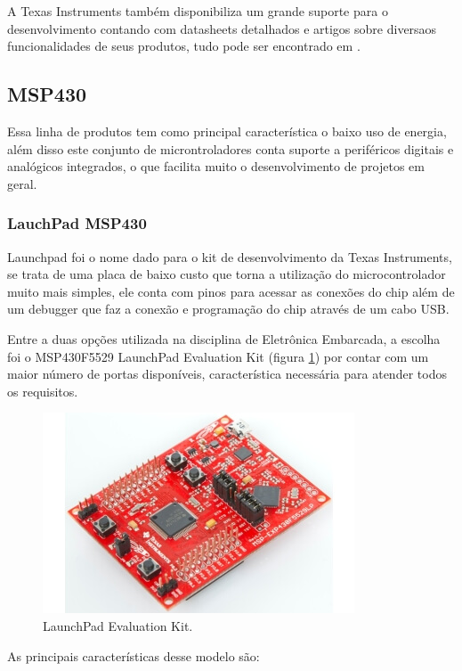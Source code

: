 A Texas Instruments também disponibiliza um grande suporte para o desenvolvimento contando com datasheets detalhados e artigos sobre diversaos funcionalidades de seus produtos, tudo pode ser encontrado em .

\subsection{MSP430}

Essa linha de produtos tem como principal característica o baixo uso de energia, além disso este conjunto de microntroladores conta suporte a periféricos digitais e analógicos integrados, o que facilita muito o desenvolvimento de projetos em geral.

\subsubsection{LauchPad MSP430}

Launchpad foi o nome dado para o kit de desenvolvimento da Texas Instruments, se trata de uma placa de baixo custo que torna a utilização do microcontrolador muito mais simples, ele conta com pinos para acessar as conexões do chip além de um debugger que faz a conexão e programação do chip através de um cabo USB.

Entre a duas opções utilizada na disciplina de Eletrônica Embarcada, a escolha foi o MSP430F5529 LaunchPad Evaluation Kit (figura \ref{fig:launchpad}) por contar com um maior número de portas disponíveis, característica necessária para atender todos os requisitos.

\begin{figure}[h!]
  \centering
  \includegraphics[width=0.7\linewidth]{figuras/launchpad.jpg}
  \caption{LaunchPad Evaluation Kit.}
  \label{fig:launchpad}
\end{figure}

As principais características desse modelo são:

